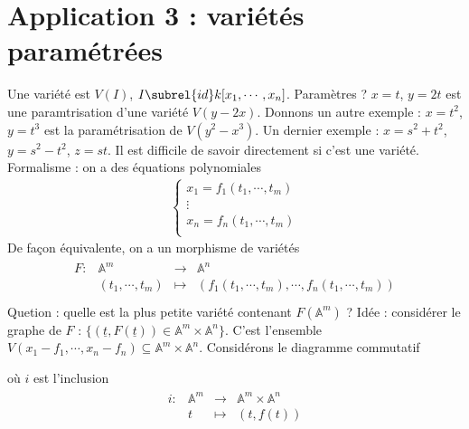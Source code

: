    \section{Application 3 : variétés paramétrées}
        Une variété est $V(I)$, $I \subrel{id} k[x_1, \cdots, x_n]$. Paramètres ? $x = t$, $y = 2t$ est une paramtrisation d'une variété $V(y - 2x)$. Donnons un autre exemple : $x = t^2$, $y = t^3$ est la paramétrisation de $V(y^2 - x^3)$. Un dernier exemple : $x = s^2 + t^2$, $y = s^2 - t^2$, $z = st$. Il est difficile de savoir directement si c'est une variété. Formalisme : on a des équations polynomiales 
        \begin{align*}
            \begin{cases}
                x_1 = f_1(t_1, \cdots, t_m) \\
                \vdots \\
                x_n = f_n(t_1, \cdots, t_m) \\
            \end{cases}
        \end{align*}
        De façon équivalente, on a un morphisme de variétés
        \begin{align*}
            \begin{array}{cccc}
                F : & \mathbb{A}^m & \to & \mathbb{A}^n \\
                & (t_1, \cdots, t_m) & \mapsto & (f_1(t_1, \cdots, t_m), \cdots, f_n(t_1, \cdots, t_m)) \\
            \end{array}
        \end{align*}
        Quetion : quelle est la plus petite variété contenant $F(\mathbb{A}^m)$ ? Idée : considérer le graphe de $F$ : $\{(\underline{t}, F(\underline{t})) \in \mathbb{A}^m \times \mathbb{A}^n\}$. C'est l'ensemble $V(x_1 - f_1, \cdots, x_n - f_n) \subseteq \mathbb{A}^m \times \mathbb{A}^n$. Considérons le diagramme commutatif
        \begin{figure}[H]
            \centering
        \end{figure}
        où $i$ est l'inclusion
        \begin{align*}
            \begin{array}{cccc}
                i : & \mathbb{A}^m & \to & \mathbb{A}^m \times \mathbb{A}^n \\
                & t & \mapsto & (t, f(t))\\
            \end{array}
        \end{align*}
